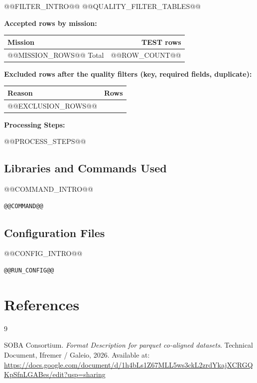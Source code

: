 \documentclass[11pt,a4paper]{article}
\begin{document}
@@FILTER_INTRO@@
@@QUALITY_FILTER_TABLES@@

\textbf{Accepted rows by mission:}
\begin{table}[H]
    \centering
    \begin{tabular}{lr}
        \toprule
        \textbf{Mission} & \textbf{TEST rows} \\
        \midrule
@@MISSION_ROWS@@
        \midrule
        Total & @@ROW_COUNT@@ \\
        \bottomrule
    \end{tabular}
\end{table}

\textbf{Excluded rows after the quality filters (key, required fields, duplicate):}
\begin{table}[H]
    \centering
    \begin{tabular}{lr}
        \toprule
        \textbf{Reason} & \textbf{Rows} \\
        \midrule
@@EXCLUSION_ROWS@@
        \bottomrule
    \end{tabular}
\end{table}

\textbf{Processing Steps:}
\begin{enumerate}
@@PROCESS_STEPS@@
\end{enumerate}

\subsection{Libraries and Commands Used}
@@COMMAND_INTRO@@
\begin{lstlisting}[caption={Command used to generate this dataset.}, label={lst:code}]
@@COMMAND@@
\end{lstlisting}

\subsection{Configuration Files}
@@CONFIG_INTRO@@
\begin{lstlisting}[caption={Settings recorded for this dataset.}, label={lst:config}]
@@RUN_CONFIG@@
\end{lstlisting}

\newpage
\newpage
\section*{References}

\begin{thebibliography}{9}

SOBA Consortium.
\textit{Format Description for parquet co-aligned datasets}.
Technical Document, Ifremer / Galeio, 2026.
Available at: \url{https://docs.google.com/document/d/1h4bLs1Z67MLL5ws3ckL2zrdYkajXCRGQKpSfnLGABes/edit?usp=sharing}

\end{thebibliography}
\end{document}
